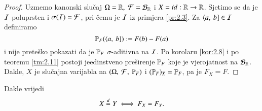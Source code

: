 \begin{proof}
    Uzmemo kanonski slu\v caj $\Omega = \mathbb{R}, \; \mathcal{F} = \mathcal{B}_{\mathbb{R}}$ i $X = id : \mathbb{R} \to \mathbb{R}$.
    Sjetimo se da je $\mathcal{I}$ poluprsten i $\sigma({\mathcal{I}}) = \mathcal{F}$, pri \v cemu je $\mathcal{I}$ iz primjera \ref{pr:2.3}.
    Za $\langle {a}, \: {b}] \in\mathcal{I}$ definiramo
    \begin{equation}    \label{jed:5.7}
        \mathbb{P}_F (\langle {a}, \: {b}]) := F (b) - F(a)
    \end{equation}
    i nije prete\v sko pokazati da je $\mathbb{P}_F$ $\sigma$-aditivna na $\mathcal{I}$.
    Po korolaru \ref{kor:2.8} i po teoremu \ref{tm:2.11} postoji jeedinstveno pre\v sirenje $\mathbb{P}_F$ koje je vjerojatnost na $\mathcal{B}_{\mathbb{R}}$.
    Dakle, $X$ je slu\v cajna varijabla na $(\Omega, \: \mathcal{F}, \: \mathbb{P}_F)$ i $(\mathbb{P}_F)_X = \mathbb{P}_F$, pa je $F_X = F$.
\end{proof}

Dakle vrijedi
\begin{equation*}
    X \overset{d}{=} Y \iff F_X = F_Y.
\end{equation*}

